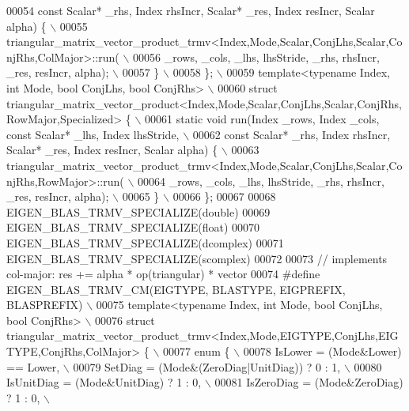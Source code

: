 \begin{DoxyCode}
00054 \textcolor{preprocessor}{                                     const Scalar* \_rhs, Index rhsIncr, Scalar* \_res, Index resIncr, Scalar
       alpha) \{ \(\backslash\)}
00055 \textcolor{preprocessor}{      triangular\_matrix\_vector\_product\_trmv<Index,Mode,Scalar,ConjLhs,Scalar,ConjRhs,ColMajor>::run( \(\backslash\)}
00056 \textcolor{preprocessor}{        \_rows, \_cols, \_lhs, lhsStride, \_rhs, rhsIncr, \_res, resIncr, alpha); \(\backslash\)}
00057 \textcolor{preprocessor}{  \} \(\backslash\)}
00058 \textcolor{preprocessor}{\}; \(\backslash\)}
00059 \textcolor{preprocessor}{template<typename Index, int Mode, bool ConjLhs, bool ConjRhs> \(\backslash\)}
00060 \textcolor{preprocessor}{struct triangular\_matrix\_vector\_product<Index,Mode,Scalar,ConjLhs,Scalar,ConjRhs,RowMajor,Specialized> \{ \(\backslash\)}
00061 \textcolor{preprocessor}{ static void run(Index \_rows, Index \_cols, const Scalar* \_lhs, Index lhsStride, \(\backslash\)}
00062 \textcolor{preprocessor}{                                     const Scalar* \_rhs, Index rhsIncr, Scalar* \_res, Index resIncr, Scalar
       alpha) \{ \(\backslash\)}
00063 \textcolor{preprocessor}{      triangular\_matrix\_vector\_product\_trmv<Index,Mode,Scalar,ConjLhs,Scalar,ConjRhs,RowMajor>::run( \(\backslash\)}
00064 \textcolor{preprocessor}{        \_rows, \_cols, \_lhs, lhsStride, \_rhs, rhsIncr, \_res, resIncr, alpha); \(\backslash\)}
00065 \textcolor{preprocessor}{  \} \(\backslash\)}
00066 \textcolor{preprocessor}{\};}
00067 
00068 EIGEN\_BLAS\_TRMV\_SPECIALIZE(\textcolor{keywordtype}{double})
00069 EIGEN\_BLAS\_TRMV\_SPECIALIZE(\textcolor{keywordtype}{float})
00070 EIGEN\_BLAS\_TRMV\_SPECIALIZE(dcomplex)
00071 EIGEN\_BLAS\_TRMV\_SPECIALIZE(scomplex)
00072 
00073 \textcolor{comment}{// implements col-major: res += alpha * op(triangular) * vector}
00074 \textcolor{preprocessor}{#define EIGEN\_BLAS\_TRMV\_CM(EIGTYPE, BLASTYPE, EIGPREFIX, BLASPREFIX) \(\backslash\)}
00075 \textcolor{preprocessor}{template<typename Index, int Mode, bool ConjLhs, bool ConjRhs> \(\backslash\)}
00076 \textcolor{preprocessor}{struct triangular\_matrix\_vector\_product\_trmv<Index,Mode,EIGTYPE,ConjLhs,EIGTYPE,ConjRhs,ColMajor> \{ \(\backslash\)}
00077 \textcolor{preprocessor}{  enum \{ \(\backslash\)}
00078 \textcolor{preprocessor}{    IsLower = (Mode&Lower) == Lower, \(\backslash\)}
00079 \textcolor{preprocessor}{    SetDiag = (Mode&(ZeroDiag|UnitDiag)) ? 0 : 1, \(\backslash\)}
00080 \textcolor{preprocessor}{    IsUnitDiag  = (Mode&UnitDiag) ? 1 : 0, \(\backslash\)}
00081 \textcolor{preprocessor}{    IsZeroDiag  = (Mode&ZeroDiag) ? 1 : 0, \(\backslash\)}

\end{DoxyCode}
